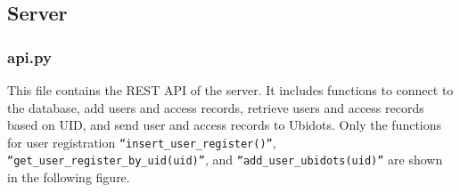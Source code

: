 \documentclass{article}
\begin{document}

\subsection{Server}
\subsubsection{api.py}
This file contains the REST API of the server.
It includes functions to connect to the database, add users and access records, retrieve users and access records based on UID, and send user and access records to Ubidots.
Only the functions for user registration \texttt{``insert\_user\_register()''}, \texttt{``get\_user\_register\_by\_uid(uid)''}, and \texttt{``add\_user\_ubidots(uid)''} are shown in the following figure.
\end{document}
